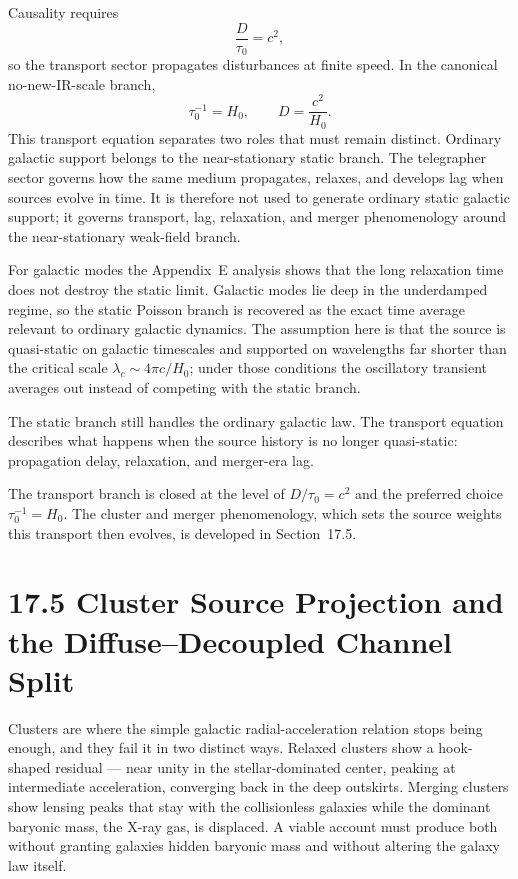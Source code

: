 \documentclass[11pt]{article}
\begin{document}
Causality requires
\[
\frac{D}{\tau_0}=c^2,
\]
so the transport sector propagates disturbances at finite speed. In the canonical no-new-IR-scale branch,
\[
\tau_0^{-1}=H_0,
\qquad
D=\frac{c^2}{H_0}.
\]
This transport equation separates two roles that must remain distinct. Ordinary galactic support belongs to the near-stationary static branch. The telegrapher sector governs how the same medium propagates, relaxes, and develops lag when sources evolve in time. It is therefore not used to generate ordinary static galactic support; it governs transport, lag, relaxation, and merger phenomenology around the near-stationary weak-field branch.

For galactic modes the Appendix~E analysis shows that the long relaxation time does not destroy the static limit. Galactic modes lie deep in the underdamped regime, so the static Poisson branch is recovered as the exact time average relevant to ordinary galactic dynamics. The assumption here is that the source is quasi-static on galactic timescales and supported on wavelengths far shorter than the critical scale $\lambda_c\sim 4\pi c/H_0$; under those conditions the oscillatory transient averages out instead of competing with the static branch.

The static branch still handles the ordinary galactic law. The transport equation describes what happens when the source history is no longer quasi-static: propagation delay, relaxation, and merger-era lag.

The transport branch is closed at the level of $D/\tau_0=c^2$ and the preferred choice $\tau_0^{-1}=H_0$. The cluster and merger phenomenology, which sets the source weights this transport then evolves, is developed in Section~17.5.

\section{17.5 Cluster Source Projection and the Diffuse--Decoupled Channel Split}

Clusters are where the simple galactic radial-acceleration relation stops being enough, and they fail it in two distinct ways. Relaxed clusters show a hook-shaped residual --- near unity in the stellar-dominated center, peaking at intermediate acceleration, converging back in the deep outskirts. Merging clusters show lensing peaks that stay with the collisionless galaxies while the dominant baryonic mass, the X-ray gas, is displaced. A viable account must produce both without granting galaxies hidden baryonic mass and without altering the galaxy law itself.
\end{document}
